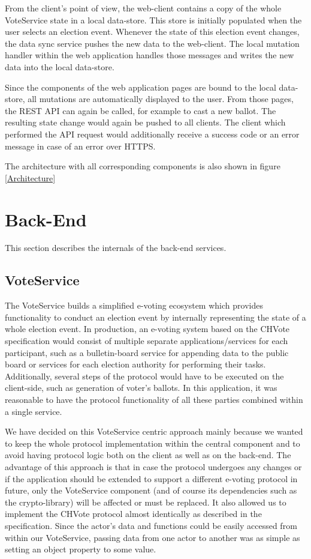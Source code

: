 From the client's point of view, the web-client contains a copy of the whole VoteService state in a local data-store. This store is initially populated when the user selects an election event. Whenever the state of this election event changes, the data sync service pushes the new data to the web-client. The local mutation handler within the web application handles those messages and writes the new data into the local data-store.

Since the components of the web application pages are bound to the local data-store, all mutations are automatically displayed to the user. From those pages, the REST API can again be called, for example to cast a new ballot. The resulting state change would again be pushed to all clients. The client which performed the API request would additionally receive a success code or an error message in case of an error over HTTPS.

The architecture with all corresponding components is also shown in figure \ref{Architecture}
\section{Back-End}
This section describes the internals of the back-end services.
\subsection{VoteService}
The VoteService builds a simplified e-voting ecosystem which provides functionality to conduct an election event by internally representing the state of a whole election event. In production, an e-voting system based on the CHVote specification would consist of multiple separate applications/services for each participant, such as a bulletin-board service for appending data to the public board or services for each election authority for performing their tasks. Additionally, several steps of the protocol would have to be executed on the client-side, such as generation of voter's ballots. In this application, it was reasonable to have the protocol functionality of all these parties combined within a single service.

We have decided on this VoteService centric approach mainly because we wanted to keep the whole protocol implementation within the central component and to avoid having protocol logic both on the client as well as on the back-end. The advantage of this approach is that in case the protocol undergoes any changes or if the application should be extended to support a different e-voting protocol in future, only the VoteService component (and of course its dependencies such as the crypto-library) will be affected or must be replaced. It also allowed us to implement the CHVote protocol almost identically as described in the specification. Since the actor's data and functions could be easily accessed from within our VoteService, passing data from one actor to another was as simple as setting an object property to some value.


